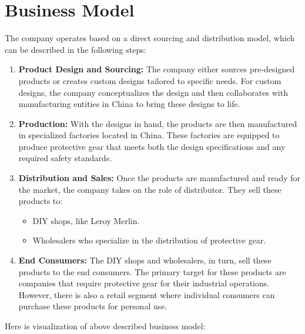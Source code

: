 \documentclass{article}
\begin{document}
\section{Business Model}
The company operates based on a direct sourcing and distribution model, which can be described in the following steps:

\begin{enumerate}
    \item \textbf{Product Design and Sourcing:} 
    The company either sources pre-designed products or creates custom designs tailored to specific needs. For custom designs, the company conceptualizes the design and then collaborates with manufacturing entities in China to bring these designs to life.

    \item \textbf{Production:} 
    With the designs in hand, the products are then manufactured in specialized factories located in China. These factories are equipped to produce protective gear that meets both the design specifications and any required safety standards.

    \item \textbf{Distribution and Sales:} 
    Once the products are manufactured and ready for the market, the company takes on the role of distributor. They sell these products to:
    \begin{itemize}
        \item DIY shops, like Leroy Merlin.
        \item Wholesalers who specialize in the distribution of protective gear.
    \end{itemize}

    \item \textbf{End Consumers:} 
    The DIY shops and wholesalers, in turn, sell these products to the end consumers. The primary target for these products are companies that require protective gear for their industrial operations. However, there is also a retail segment where individual consumers can purchase these products for personal use.
\end{enumerate}

Here is visualization of above described business model:
\end{document}
